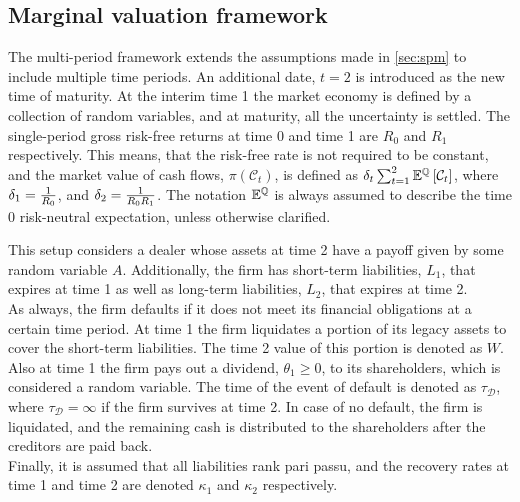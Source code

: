 \documentclass[main.tex]{subfiles}
\begin{document}
    \subsection{Marginal valuation framework}
        The multi-period framework extends the assumptions made in \cref{sec:spm} to include multiple time periods.
        An additional date, $t=2$ is introduced as the new time of maturity.
        At the interim time 1 the market economy is defined by a collection of random variables,
        and at maturity, all the uncertainty is settled. 
        The single-period gross risk-free returns at time 0 and time 1 are $R_0$ and $R_1$ respectively.
        This means, that the risk-free rate is not required to be constant,
        and the market value of cash flows,
        $\pi(\mathcal{C}_{t})$, is defined as
        $\delta_t \sum_{t=1}^{2}\mathbb{E}^{\mathbb{Q}}\left[\mathcal{C}_{t}\right]$,
        where $\delta_1 = \frac{1}{R_{0}}$,
        and $\delta_2 = \frac{1}{R_{0}R_{1}}$.
        The notation $\mathbb{E}^{\mathbb{Q}}$ is always assumed to describe the time 0 risk-neutral expectation, unless otherwise clarified.

        This setup considers a dealer whose assets at time 2 have a payoff given by some random variable $A$.
        Additionally, the firm has short-term liabilities, $L_1$, that expires at time 1 as well as long-term liabilities, $L_2$, that expires at time 2.
        \\
        As always, the firm defaults if it does not meet its financial obligations at a certain time period.
        At time 1 the firm liquidates a portion of its legacy assets to cover the short-term liabilities.
        The time 2 value of this portion is denoted as $W$.
        Also at time 1 the firm pays out a dividend, $\theta_1 \geq 0$, to its shareholders,
        which is considered a random variable.
        The time of the event of default is denoted as $\tau_{\mathcal{D}}$,
        where $\tau_{\mathcal{D}} = \infty$ if the firm survives at time 2.
        In case of no default, the firm is liquidated, and the remaining cash is distributed to the shareholders after the creditors are paid back.
        \\
        Finally, it is assumed that all liabilities rank pari passu,
        and the recovery rates at time 1 and time 2 are denoted $\kappa_1$ and $\kappa_2$ respectively.
\end{document}
